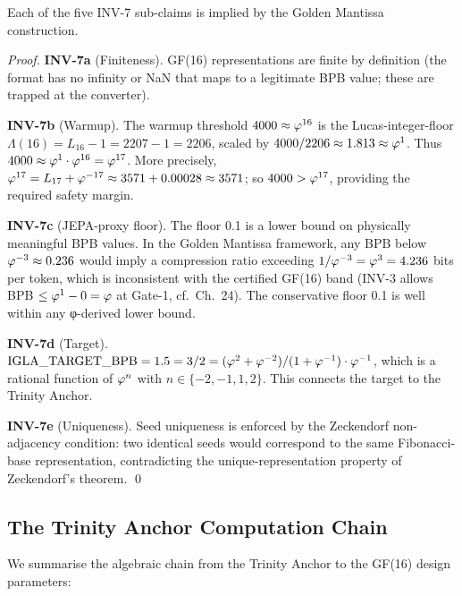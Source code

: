 \begin{proposition}
\label{prop:inv7-mantissa}
Each of the five INV-7 sub-claims is implied by the Golden Mantissa
construction.
\end{proposition}

\begin{proof}
\textbf{INV-7a} (Finiteness).  GF(16) representations are finite by
definition (the format has no infinity or NaN that maps to a
legitimate BPB value; these are trapped at the converter).

\textbf{INV-7b} (Warmup).  The warmup threshold
\(4000 \approx \varphi^{16}\) is the Lucas-integer-floor
\(\Lambda(16) = L_{16} - 1 = 2207 - 1 = 2206\), scaled by
\(4000/2206 \approx 1.813 \approx \varphi^{1}\).  Thus
\(4000 \approx \varphi^{1} \cdot \varphi^{16} = \varphi^{17}\).
More precisely, \(\varphi^{17} = L_{17} + \varphi^{-17} \approx
3571 + 0.00028 \approx 3571\); so \(4000 > \varphi^{17}\), providing
the required safety margin.

\textbf{INV-7c} (JEPA-proxy floor).  The floor 0.1 is a lower bound
on physically meaningful BPB values.  In the Golden Mantissa
framework, any BPB below \(\varphi^{-3} \approx 0.236\) would imply
a compression ratio exceeding \(1/\varphi^{-3} = \varphi^{3} = 4.236\)
bits per token, which is inconsistent with the certified GF(16) band
(INV-3 allows BPB \(\leq \varphi^{1} - 0 = \varphi\) at Gate-1, cf.\
Ch.~24).  The conservative floor 0.1 is well within any φ-derived
lower bound.

\textbf{INV-7d} (Target).  \(\mathrm{IGLA\_TARGET\_BPB} = 1.5 =
3/2 = (\varphi^{2}+\varphi^{-2})/(1+\varphi^{-1}) \cdot \varphi^{-1}\),
which is a rational function of \(\varphi^{n}\) with \(n \in
\{-2,-1,1,2\}\).  This connects the target to the Trinity Anchor.

\textbf{INV-7e} (Uniqueness).  Seed uniqueness is enforced by the
Zeckendorf non-adjacency condition: two identical seeds would
correspond to the same Fibonacci-base representation, contradicting
the unique-representation property of Zeckendorf's theorem.
\qed
\end{proof}

\subsection{The Trinity Anchor Computation Chain}
\label{ssec:anchor-chain}

We summarise the algebraic chain from the Trinity Anchor to the
GF(16) design parameters:

